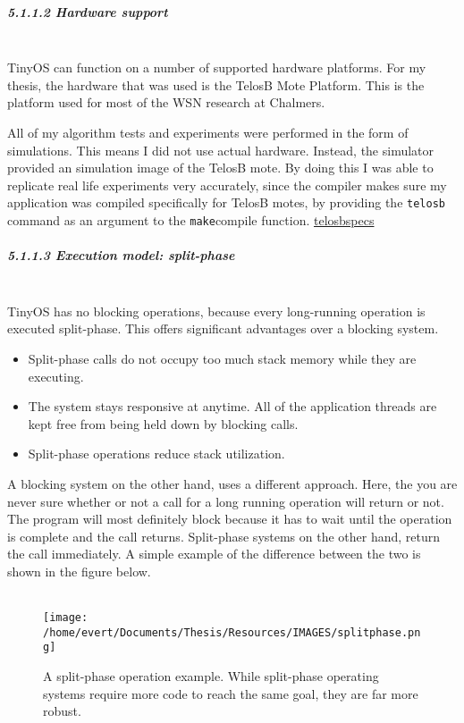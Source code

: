 \subparagraph{5.1.1.2 Hardware support\\\\}\label{hardware-support}

TinyOS can function on a number of supported hardware platforms. For my
thesis, the hardware that was used is the TelosB Mote Platform. This is
the platform used for most of the WSN research at Chalmers.

All of my algorithm tests and experiments were performed in the form of
simulations. This means I did not use actual hardware. Instead, the
simulator provided an simulation image of the TelosB mote. By doing this
I was able to replicate real life experiments very accurately, since the
compiler makes sure my application was compiled specifically for TelosB
motes, by providing the \texttt{telosb} command as an argument to the
\texttt{make}compile function.
\href{http://www.willow.co.uk/html/telosb_mote_platform.php}{telosbspecs}

\subparagraph{5.1.1.3 Execution model:
split-phase\\\\}\label{execution-model-split-phase}

TinyOS has no blocking operations, because every long-running operation
is executed split-phase. This offers significant advantages over a
blocking system.

\begin{itemize}
\itemsep1pt\parskip0pt
\item
  Split-phase calls do not occupy too much stack memory while they are
  executing.
\item
  The system stays responsive at anytime. All of the application threads
  are kept free from being held down by blocking calls.
\item
  Split-phase operations reduce stack utilization.
\end{itemize}

A blocking system on the other hand, uses a different approach. Here,
the you are never sure whether or not a call for a long running
operation will return or not. The program will most definitely block
because it has to wait until the operation is complete and the call
returns. Split-phase systems on the other hand, return the call
immediately. A simple example of the difference between the two is shown
in the figure below.\\\\

\begin{figure}[htbp]
\centering
\texttt{[image: /home/evert/Documents/Thesis/Resources/IMAGES/splitphase.png]}
\caption{A split-phase operation example. While split-phase operating systems require more code to reach the same goal, they are far more robust.}
\end{figure}

